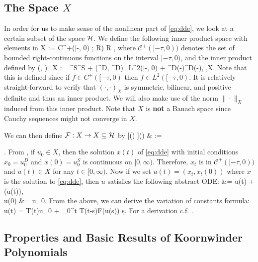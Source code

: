 \subsection{The Space \(X\)}

In order for us to make sense of the nonlinear part of \cref{eq:dde}, we look at a certain subset of the space \(\mathcal H\). We define the following inner product space with elements in 
\be
    X := \mathcal C^+([-\tau, 0) ; \mathbb R) \times \mathbb R \subseteq \mcH,
\ee
where \(\mathcal C^+([-\tau, 0))\) denotes the set of bounded right-continuous functions on the interval \([-\tau, 0)\), and the inner product defined by
\be
    (\Phi, \Psi)_X := \Phi^S\Psi^S +  \tau (\Phi^D, \Psi^D)_{L^2([-\tau, 0)} + \Phi^D(-\tau)\Psi^D(-\tau), \quad \Phi,\Psi\in X.
\ee
Note that this is defined since if \(f\in C^+([-\tau, 0)\) then \(f\in L^2([-\tau,0)\). It is relatively straight-forward to verify that \((\cdot, \cdot)_X\) is symmetric, bilinear, and positive definite and thus an inner product. We will also make use of the norm \(\|\cdot\|_X\) induced from this inner product. Note that \(X\) is \textbf{not} a Banach space since Cauchy sequences might not converge in \(X\). 

We can then define \(\mathcal F:X\to X\subseteq\mathcal H\) by 
\bea \label{mcF}
    [\mcF (\Psi) ](\theta) & := \begin{cases}
    0, &  \theta \in[-\tau, 0),   \vspace{0.4em}\\ 
    F \left( \Psi^D(-\tau) \right), & \theta = 0, 
    \end{cases}  .
\eea
From \cite[Thm.~2.4.1]{CZ95}, if \(u_0\in X\), then the solution \(x(t)\) of \cref{eq:dde} with initial conditions \(x_0 =  u_0^D\) and \(x(0) = u_0^S\) is continuous on \([0,\infty)\). Therefore, \(x_t\) is in \(\mathcal C^+([-\tau, 0))\) and \(u(t)\in X\) for any \(t\in[0,\infty)\). Now if we set \(u(t) = (x_t, x_t(0))\) where \(x\) is the solution to \cref{eq:dde}, then \(u\) satisfies the following abstract ODE:
\bea\label{eq:abstract_ode}
     &= \mcA u(t) + \mcF(u(t)), \\
    u(0) &= u_0.
\eea
From the above, we can derive the variation of constants formula:
\be
    u(t) = T(t)u_0 + \int_0^t T(t-s)\mathcal F(u(s)) \d s.
\ee
For a derivation c.f. \cite[pg.~105]{P83}.

\subsection{Properties and Basic Results of Koornwinder Polynomials}


